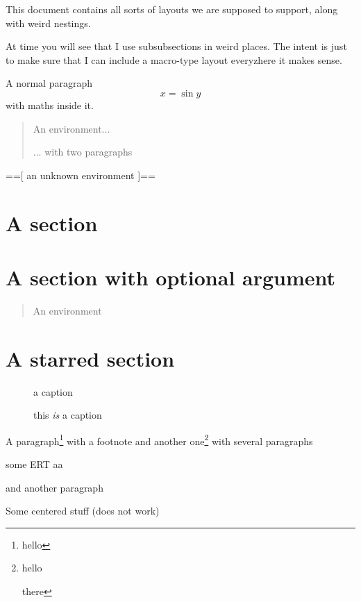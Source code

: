 \documentclass[legalpaper]{article}
\newenvironment{foo}{==[}{]==}
\begin{document}
This document contains all sorts of layouts we are supposed to
support, along with weird nestings.

At time you will see that I use subsubsections in weird places. The
intent is just to make sure that I can include a macro-type layout
everyzhere it makes sense.

A normal paragraph
\begin{equation}
x = \sin y
\end{equation}
with maths inside it.

\begin{quote}
An environment...

... with two paragraphs
\end{quote}

\begin{foo}
an unknown environment
\end{foo}


\section{A section}

\section[Hello!]{A section with optional argument}

\begin{quote}
An environment
\end{quote}

\section*{A starred section}

\begin{figure}
\caption{ \emph{} a caption}
\end{figure}

\begin{figure}
\caption[srt]{this \emph{is} a caption}
\end{figure}

A paragraph\footnote{hello} with a footnote and another
one\footnote{hello

there} with several paragraphs

some ERT \vspace{1cm} aa

and another paragraph

\begin{center}
Some centered stuff (does not work)
\end{center}
\end{document}

